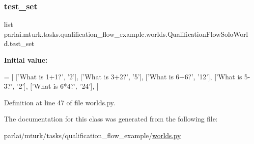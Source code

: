 \subsubsection{\texorpdfstring{test\+\_\+set}{test\_set}}
{\footnotesize\ttfamily list parlai.\+mturk.\+tasks.\+qualification\+\_\+flow\+\_\+example.\+worlds.\+Qualification\+Flow\+Solo\+World.\+test\+\_\+set\hspace{0.3cm}{\ttfamily [static]}}

{\bfseries Initial value\+:}
\begin{DoxyCode}
=  [
        [\textcolor{stringliteral}{'What is 1+1?'}, \textcolor{stringliteral}{'2'}],
        [\textcolor{stringliteral}{'What is 3+2?'}, \textcolor{stringliteral}{'5'}],
        [\textcolor{stringliteral}{'What is 6+6?'}, \textcolor{stringliteral}{'12'}],
        [\textcolor{stringliteral}{'What is 5-3?'}, \textcolor{stringliteral}{'2'}],
        [\textcolor{stringliteral}{'What is 6*4?'}, \textcolor{stringliteral}{'24'}],
    ]
\end{DoxyCode}


Definition at line 47 of file worlds.\+py.



The documentation for this class was generated from the following file\+:\begin{DoxyCompactItemize}
\item 
parlai/mturk/tasks/qualification\+\_\+flow\+\_\+example/\hyperlink{parlai_2mturk_2tasks_2qualification__flow__example_2worlds_8py}{worlds.\+py}\end{DoxyCompactItemize}
